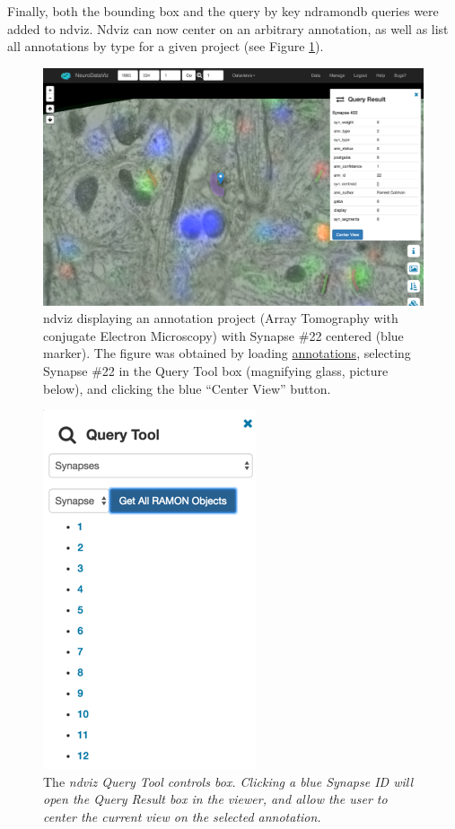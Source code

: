 \documentclass[simplex.tex]{subfiles}
\begin{document}
Finally, both the bounding box and the query by key ndramondb queries
were added to ndviz. Ndviz can now center on an arbitrary annotation, as
well as list all annotations by type for a given project (see Figure
\ref{fig:ndviz}).
\begin{figure}[h!]
\begin{cframed}
\centering
\includegraphics[width=\textwidth]{../../figs/ndviz.png}
\caption{ndviz displaying an annotation project (Array Tomography with conjugate Electron Microscopy) with Synapse \#22 centered (blue marker). 
The figure was obtained by loading 
\href{http://synaptomes.neurodata.io/ndv/project/collman15_annotations/xy/1/1590/1069/0/}{annotations}, selecting Synapse \#22 in the Query Tool box (magnifying glass, picture below), and clicking the blue ``Center View'' button. 
}
\label{fig:ndviz}
\end{cframed}
\end{figure}


\begin{figure}[h!]
\begin{cframed}
\centering
\includegraphics[width=.25\textwidth]{../../figs/ndviz-query.png}
\caption{The \itshape{ndviz} Query Tool controls box. Clicking a blue Synapse ID
  will open the Query Result box in the viewer, and allow the user to
  center the current view on the selected annotation.}
\label{fig:ndviz-query}
\end{cframed}
\end{figure}
\end{document}

